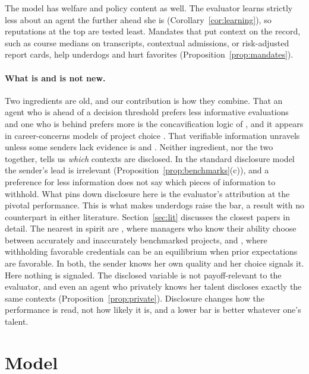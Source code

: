 \documentclass[11pt]{article}
\theoremstyle{definition}
\begin{document}
The model has welfare and policy content as well. The evaluator learns strictly less about an agent the further ahead she is (Corollary~\ref{cor:learning}), so reputations at the top are tested least. Mandates that put context on the record, such as course medians on transcripts, contextual admissions, or risk-adjusted report cards, help underdogs and hurt favorites (Proposition~\ref{prop:mandates}).

\paragraph{What is and is not new.} Two ingredients are old, and our contribution is how they combine. That an agent who is ahead of a decision threshold prefers less informative evaluations and one who is behind prefers more is the concavification logic of \citet{KamenicaGentzkow2011}, and it appears in career-concerns models of project choice \citep{Hermalin1993,Zwiebel1995}. That verifiable information unravels unless some senders lack evidence is \citet{Dye1985} and \citet{JungKwon1988}. Neither ingredient, nor the two together, tells us \emph{which} contexts are disclosed. In the standard disclosure model the sender's lead is irrelevant (Proposition~\ref{prop:benchmarks}(c)), and a preference for less information does not say which pieces of information to withhold. What pins down disclosure here is the evaluator's attribution at the pivotal performance. This is what makes underdogs raise the bar, a result with no counterpart in either literature. Section~\ref{sec:lit} discusses the closest papers in detail. The nearest in spirit are \citet{Zwiebel1995}, where managers who know their ability choose between accurately and inaccurately benchmarked projects, and \citet{HarbaughTo2020}, where withholding favorable credentials can be an equilibrium when prior expectations are favorable. In both, the sender knows her own quality and her choice signals it. Here nothing is signaled. The disclosed variable is not payoff-relevant to the evaluator, and even an agent who privately knows her talent discloses exactly the same contexts (Proposition~\ref{prop:private}). Disclosure changes how the performance is read, not how likely it is, and a lower bar is better whatever one's talent.

\section{Model}\label{sec:model}
\end{document}
